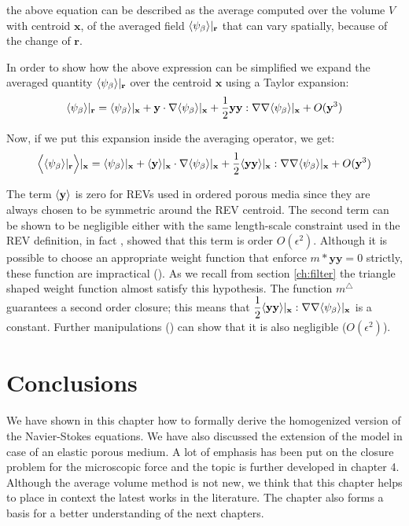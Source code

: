 \noindent the above equation can be described as the average computed over the volume $V$ with centroid $\mathbf{x}$, of the averaged field ${\left< \psi_{\beta} \right>}|_{\mathbf{r}}$ that can vary spatially, because of the change of $\mathbf{r}$.

In order to show how the above expression can be simplified we expand the averaged quantity ${\left< \psi_{\beta} \right>}|_{\mathbf{r}}$ over the centroid $\mathbf{x}$ using a Taylor expansion:
$$
{\left< \psi_{\beta} \right>}|_{\mathbf{r}} = {\left< \psi_{\beta} \right>}|_{\mathbf{x}} + \mathbf{y} \cdot \nabla {\left< \psi_{\beta} \right>}|_{\mathbf{x}} + \dfrac{1}{2} \mathbf{y}\mathbf{y} :  \nabla \nabla {\left< \psi_{\beta} \right>}|_{\mathbf{x}} + O(\mathbf{y}^3)
$$

Now, if we put this expansion inside the averaging operator, we get:
$$
\Big< {\left< \psi_{\beta} \right>}|_{\mathbf{r}} \Big>|_{\mathbf{x}} = {\left< \psi_{\beta} \right>}|_{\mathbf{x}} + {\left< \mathbf{y} \right>}|_{\mathbf{x}} \cdot \nabla {\left< \psi_{\beta} \right>}|_{\mathbf{x}} + \dfrac{1}{2} {\left< \mathbf{y}\mathbf{y} \right>}|_{\mathbf{x}} :  \nabla \nabla {\left< \psi_{\beta} \right>}|_{\mathbf{x}} + O(\mathbf{y}^3)
$$

The term ${\left< \mathbf{y} \right>}$ is zero for REVs used in ordered porous media since they are always chosen to be symmetric around the REV centroid.
The second term can be shown to be negligible either with the same length-scale constraint used in the REV definition, in fact \citet{ochoa1995momentum}, \citet{paez2017macroscopic} showed that this term is order $O(\epsilon^2)$.
Although it is possible to choose an appropriate weight function that  enforce $m*\mathbf{y}\mathbf{y} =0$ strictly, these function are impractical (\citet{davit2017technical}).
As we recall from section \ref{ch:filter} the triangle shaped weight function almost satisfy this hypothesis. The function $m^{\triangle}$ guarantees a second order closure; this means that $\dfrac{1}{2} {\left< \mathbf{y}\mathbf{y} \right>}|_{\mathbf{x}} :  \nabla \nabla {\left< \psi_{\beta} \right>}|_{\mathbf{x}}$ is a constant. Further manipulations (\cite{davit2017technical}) can show that it is also negligible ($O(\epsilon^2)$).

\section{Conclusions}
We have shown in this chapter how to formally derive the homogenized version of the Navier-Stokes equations. We have also discussed the extension of the model in case of an elastic porous medium. A lot of emphasis has been put on the closure problem for the microscopic force and the topic is further developed in chapter 4.
Although the average volume method is not new, we think that this chapter helps to place in context the latest works in the literature. The chapter also forms a basis for a better understanding of the next chapters.

